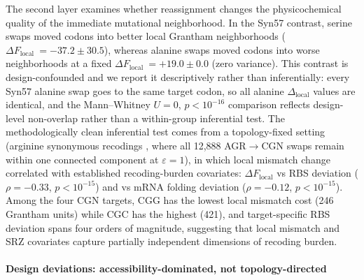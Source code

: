 \documentclass[preprint,11pt,authoryear,a4paper]{elsarticle}
\begin{document}
The second layer examines whether reassignment changes the
physicochemical quality of the immediate mutational neighborhood. In the
Syn57 contrast, serine swaps moved codons into better local Grantham
neighborhoods (\(\Delta F_{\text{local }} = - 37.2 \pm 30.5\)), whereas
alanine swaps moved codons into worse neighborhoods at a fixed
\(\Delta F_{\text{local }} = + 19.0 \pm 0.0\) (zero variance). This
contrast is design-confounded and we report it descriptively rather than
inferentially: every Syn57 alanine swap goes to the same target codon,
so all alanine \(\Delta_{\text{local}}\) values are identical, and the
Mann--Whitney \(U = 0\), \(p < 10^{- 16}\) comparison reflects
design-level non-overlap rather than a within-group inferential test.
The methodologically clean inferential test comes from a topology-fixed
setting (arginine synonymous recodings \citep{napolitano2016}, where all
12,888 AGR\(\rightarrow\)CGN swaps remain within one connected component
at \(\varepsilon = 1\)), in which local mismatch change correlated with
established recoding-burden covariates: \(\Delta F_{\text{local}}\) vs
RBS deviation (\(\rho = - 0.33\), \(p < 10^{- 15}\)) and vs mRNA folding
deviation (\(\rho = - 0.12\), \(p < 10^{- 15}\)). Among the four CGN
targets, CGG has the lowest local mismatch cost (246 Grantham units)
while CGC has the highest (421), and target-specific RBS deviation spans
four orders of magnitude, suggesting that local mismatch and SRZ
covariates capture partially independent dimensions of recoding burden.

\paragraph{Design deviations: accessibility-dominated, not
topology-directed}
\end{document}

